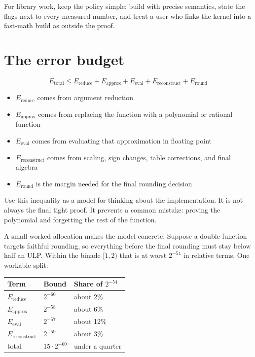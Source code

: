 \documentclass[manuscript, nonacm]{acmart}
\begin{document}
  For library work, keep the policy simple: build with precise semantics, state
  the flags next to every measured number, and treat a user who links the kernel
  into a fast-math build as outside the proof.



  \section{The error budget}

  \[
    E_\mathrm{total} \le E_\mathrm{reduce} + E_\mathrm{approx} +
    E_\mathrm{eval} + E_\mathrm{reconstruct} + E_\mathrm{round}
  \]

  \begin{itemize}
    \item $E_\mathrm{reduce}$ comes from argument reduction
    \item $E_\mathrm{approx}$ comes from replacing the function with a
    polynomial or rational function
    \item $E_\mathrm{eval}$ comes from evaluating that approximation in
    floating point
    \item $E_\mathrm{reconstruct}$ comes from scaling, sign changes, table
    corrections, and final algebra
    \item $E_\mathrm{round}$ is the margin needed for the final rounding
    decision
  \end{itemize}

  Use this inequality as a model for thinking about the implementation. It is
  not always the final tight proof. It prevents a common mistake: proving the
  polynomial and forgetting the rest of the function.

  A small worked allocation makes the model concrete. Suppose a double
  function targets faithful rounding, so everything before the final
  rounding must stay below half an ULP. Within the binade $[1, 2)$ that is
  at worst $2^{-54}$ in relative terms. One workable split:

  \begin{table}[tbp]
    \centering
    \begin{tabular}{lll}
      \toprule
      Term                     & Bound              & Share of $2^{-54}$ \\
      \midrule
      $E_\mathrm{reduce}$      & $2^{-60}$          & about 2\%          \\
      $E_\mathrm{approx}$      & $2^{-58}$          & about 6\%          \\
      $E_\mathrm{eval}$        & $2^{-57}$          & about 12\%         \\
      $E_\mathrm{reconstruct}$ & $2^{-59}$          & about 3\%          \\
      \midrule
      total                    & $15 \cdot 2^{-60}$ & under a quarter    \\
      \bottomrule
    \end{tabular}
  \end{table}
\end{document}
